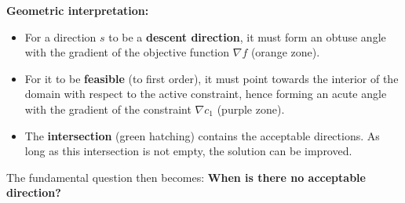 \begin{figureexplanation}
\textbf{Geometric interpretation:}
\begin{itemize}
    \item For a direction $s$ to be a \textbf{descent direction}, it must form an obtuse angle with the gradient of the objective function $\nabla f$ (orange zone).
    \item For it to be \textbf{feasible} (to first order), it must point towards the interior of the domain with respect to the active constraint, hence forming an acute angle with the gradient of the constraint $\nabla c_1$ (purple zone).
    \item The \textbf{intersection} (green hatching) contains the acceptable directions. As long as this intersection is not empty, the solution can be improved.
\end{itemize}
\end{figureexplanation}

The fundamental question then becomes: \textbf{When is there no acceptable direction?}

